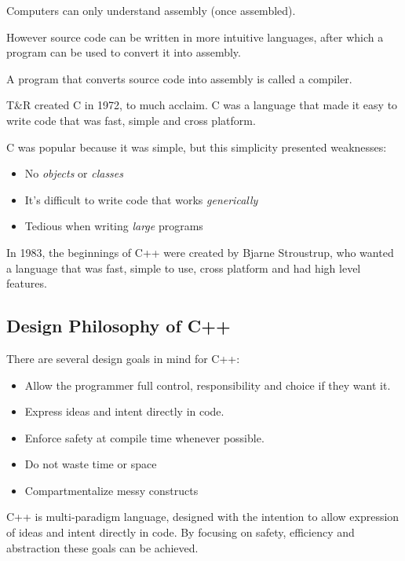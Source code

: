 \documentclass[]{article}
\begin{document}
Computers can only understand assembly (once assembled).

However source code can be written in more intuitive languages, after which a program can be used to convert it into assembly.

\begin{definition}
    A program that converts source code into assembly is called a compiler.
\end{definition}

T\&R created C in 1972, to much acclaim.
C was a language that made it easy to write code that was fast, simple and cross platform.

C was popular because it was simple, but this simplicity presented weaknesses:
\begin{itemize}
    \item No \emph{objects} or \emph{classes}
    \item It's difficult to write code that works \emph{generically}
    \item Tedious when writing \emph{large} programs
\end{itemize}

In 1983, the beginnings of C++ were created by Bjarne Stroustrup, who wanted a language that was fast, simple to use, cross platform and had high level features.


\subsection{Design Philosophy of C++}

There are several design goals in mind for C++:

\begin{itemize}
    \item Allow the programmer full control, responsibility and choice if they want it.
    \item Express ideas and intent directly in code.
    \item Enforce safety at compile time whenever possible.
    \item Do not waste time or space
    \item Compartmentalize messy constructs
\end{itemize}

C++ is multi-paradigm language, designed with the intention to allow expression of ideas and intent directly in code. By focusing on safety, efficiency and abstraction these goals can be achieved.
\end{document}
